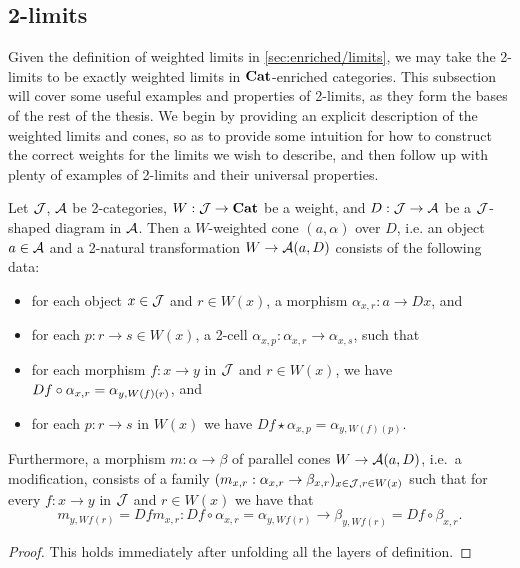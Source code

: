 \documentclass[../thesis.tex]{subfiles}
\begin{document}
\subsection{2-limits}
Given the definition of weighted limits in \cref{sec:enriched/limits}, we may take the 2-limits to be exactly weighted limits
in ${\mathbf{Cat}}$-enriched categories. This subsection will cover some useful examples and properties of 2-limits, as they form the
bases of the rest of the thesis. We begin by providing an explicit description of the weighted limits and cones, so as to
provide some intuition for how to construct the correct weights for the limits we wish to describe, and then follow up with
plenty of examples of 2-limits and their universal properties.

\begin{proposition}\label{prop:desc of 2-limits}
  Let ${\mathcal{J}}$, ${\mathcal{A}}$ be 2-categories, $W : {\mathcal{J}} \to {\mathbf{Cat}}$ be a weight, and $D : {\mathcal{J}} \to {\mathcal{A}}$ be a ${\mathcal{J}}$-shaped diagram in ${\mathcal{A}}$.
  Then a $W$-weighted cone $(a,\alpha)$ over $D$, i.e. an object $a \in {\mathcal{A}}$ and a 2-natural transformation $W \to {\mathcal{A}}(a,D)$
  consists of the following data:
  \begin{itemize}
    \item for each object $x \in {\mathcal{J}}$ and $r \in W(x)$, a morphism $\alpha_{x,r} : a \to Dx$,
      and
    \item for each $p : r \to s \in W(x)$, a 2-cell $\alpha_{x,p} : \alpha_{x,r} \to \alpha_{x,s}$,
      such that
    \item for each morphism $f : x \to y$ in ${\mathcal{J}}$ and $r \in W(x)$, we have $Df \circ \alpha_%
      {x,r} = \alpha_{y,W(f)(r)}$, and
    \item for each $p : r \to s$ in $W(x)$ we have $Df \star \alpha_{x,p} = \alpha_{y,W(f)(p)}$.
  \end{itemize} 

  Furthermore, a morphism $m : \alpha \to \beta$ of parallel cones $W \to {\mathcal{A}}(a,D)$, i.e.\ a modification,
  consists of a family $(m_{x,r} : \alpha_{x,r} \to \beta_{x,r})_{x \in {\mathcal{J}}, r \in W(x)}$ such that for every
  $f : x \to y$ in ${\mathcal{J}}$  and $r \in W(x)$ we have that
  \[m_{y,Wf(r)} = Df m_{x,r} : Df \circ \alpha_{x,r} = \alpha_{y,Wf(r)} \to \beta_{y,Wf(r)}
  = Df \circ \beta_{x,r}.\]
\end{proposition}
\begin{proof}
  This holds immediately after unfolding all the layers of definition.
\end{proof}
\end{document}
